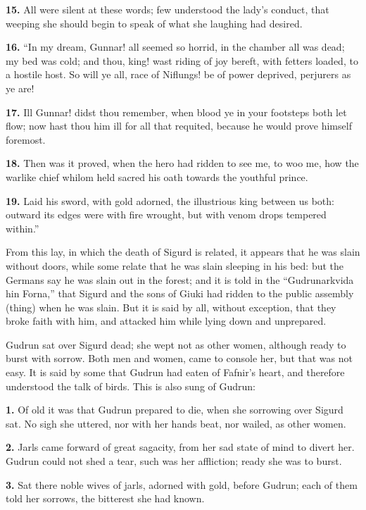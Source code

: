 \textbf{15.} All were silent at these words; few understood the lady's
conduct, that weeping she should begin to speak of what she laughing
had desired.

\textbf{16.} ``In my dream, Gunnar! all seemed so horrid, in the chamber all
was dead; my bed was cold; and thou, king! wast riding of joy bereft,
with fetters loaded, to a hostile host. So will ye all, race of
Niflungs! be of power deprived, perjurers as ye are!

\textbf{17.} Ill Gunnar! didst thou remember, when blood ye in your footsteps
both let flow; now hast thou him ill for all that requited, because he
would prove himself foremost.

\textbf{18.} Then was it proved, when the hero had ridden to see me, to woo
me, how the warlike chief whilom held sacred his oath towards the
youthful prince.

\textbf{19.} Laid his sword, with gold adorned, the illustrious king between
us both: outward its edges were with fire wrought, but with venom
drops tempered within.''

From this lay, in which the death of Sigurd is related, it appears
that he was slain without doors, while some relate that he was slain
sleeping in his bed: but the Germans say he was slain out in the
forest; and it is told in the ``Gudrunarkvida hin Forna,'' that Sigurd
and the sons of Giuki had ridden to the public assembly (thing) when
he was slain. But it is said by all, without exception, that they
broke faith with him, and attacked him while lying down and
unprepared.


Gudrun sat over Sigurd dead; she wept not as other women, although
ready to burst with sorrow. Both men and women, came to console her,
but that was not easy. It is said by some that Gudrun had eaten of
Fafnir's heart, and therefore understood the talk of birds. This is
also sung of Gudrun:

\textbf{1.} Of old it was that Gudrun prepared to die, when she sorrowing
over Sigurd sat. No sigh she uttered, nor with her hands beat, nor
wailed, as other women.

\textbf{2.} Jarls came forward of great sagacity, from her sad state of mind
to divert her. Gudrun could not shed a tear, such was her affliction;
ready she was to burst.

\textbf{3.} Sat there noble wives of jarls, adorned with gold, before Gudrun;
each of them told her sorrows, the bitterest she had known.

